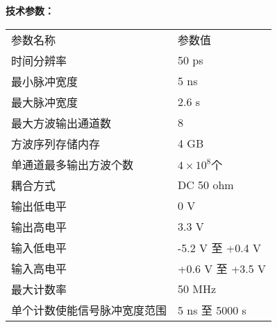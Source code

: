 \vspace{0.3cm}
\noindent\xiaosi\textbf{技术参数：}
\vspace{0.3cm}
\song
\begin{table}[H]
{}
\begin{tabular}{m{6.5cm}|m{6.5cm}}
\rowcolor{myblue}
\color{white}参数名称& \color{white}参数值\\\arrayrulecolor{tabcolor}\midrule[1.2pt]
时间分辨率& 50 ps\\\arrayrulecolor{tabcolor}\midrule[1.2pt]
最小脉冲宽度& 5 ns \\\arrayrulecolor{tabcolor}\midrule[1.2pt]
最大脉冲宽度& 2.6 s\\\arrayrulecolor{tabcolor}\midrule[1.2pt]
最大方波输出通道数& 8\\\arrayrulecolor{tabcolor}\midrule[1.2pt]
方波序列存储内存& 4 GB\\\arrayrulecolor{tabcolor}\midrule[1.2pt]
单通道最多输出方波个数& $4\times 10^8$个\\\midrule[1.2pt]
耦合方式& DC 50 ohm\\\arrayrulecolor{tabcolor}\midrule[1.2pt]
输出低电平& 0 V\\\arrayrulecolor{tabcolor}\midrule[1.2pt]
输出高电平& 3.3 V\\\arrayrulecolor{tabcolor}\midrule[1.2pt]
输入低电平& -5.2 V 至 +0.4 V\\\arrayrulecolor{tabcolor}\midrule[1.2pt]
输入高电平& +0.6 V 至 +3.5 V\\\arrayrulecolor{tabcolor}\midrule[1.2pt]
最大计数率& 50 MHz\\\arrayrulecolor{tabcolor}\midrule[1.2pt]
单个计数使能信号脉冲宽度范围& 5 ns 至 5000 s\\
\end{tabular}
\end{table}



